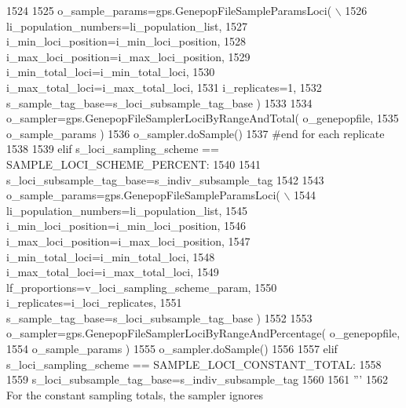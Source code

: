 \begin{DoxyCode}
1524 
1525                 o\_sample\_params=gps.GenepopFileSampleParamsLoci( \(\backslash\)
1526                                             li\_population\_numbers=li\_population\_list,
1527                                             i\_min\_loci\_position=i\_min\_loci\_position,
1528                                             i\_max\_loci\_position=i\_max\_loci\_position,
1529                                             i\_min\_total\_loci=i\_min\_total\_loci,
1530                                             i\_max\_total\_loci=i\_max\_total\_loci,
1531                                             i\_replicates=1,
1532                                             s\_sample\_tag\_base=s\_loci\_subsample\_tag\_base )
1533 
1534                 o\_sampler=gps.GenepopFileSamplerLociByRangeAndTotal( o\_genepopfile,
1535                                                                         o\_sample\_params )
1536                 o\_sampler.doSample()
1537             \textcolor{comment}{#end for each replicate}
1538 
1539         \textcolor{keywordflow}{elif} s\_loci\_sampling\_scheme == SAMPLE\_LOCI\_SCHEME\_PERCENT:
1540 
1541             s\_loci\_subsample\_tag\_base=s\_indiv\_subsample\_tag
1542 
1543             o\_sample\_params=gps.GenepopFileSampleParamsLoci( \(\backslash\)
1544                                                     li\_population\_numbers=li\_population\_list,
1545                                                     i\_min\_loci\_position=i\_min\_loci\_position,
1546                                                     i\_max\_loci\_position=i\_max\_loci\_position,
1547                                                     i\_min\_total\_loci=i\_min\_total\_loci,
1548                                                     i\_max\_total\_loci=i\_max\_total\_loci,
1549                                                     lf\_proportions=v\_loci\_sampling\_scheme\_param,
1550                                                     i\_replicates=i\_loci\_replicates,
1551                                                     s\_sample\_tag\_base=s\_loci\_subsample\_tag\_base )
1552 
1553             o\_sampler=gps.GenepopFileSamplerLociByRangeAndPercentage( o\_genepopfile,
1554                                                                     o\_sample\_params )
1555             o\_sampler.doSample()
1556 
1557         \textcolor{keywordflow}{elif} s\_loci\_sampling\_scheme == SAMPLE\_LOCI\_CONSTANT\_TOTAL:
1558 
1559             s\_loci\_subsample\_tag\_base=s\_indiv\_subsample\_tag
1560         
1561             \textcolor{stringliteral}{'''}
1562 \textcolor{stringliteral}{            For the constant sampling totals, the sampler ignores }

\end{DoxyCode}
